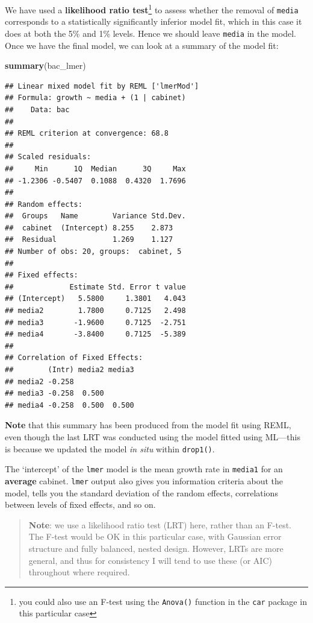 \documentclass[]{book}
\newenvironment{Shaded}{\begin{snugshade}}{\end{snugshade}}
\newcommand{\KeywordTok}[1]{\textcolor[rgb]{0.13,0.29,0.53}{\textbf{#1}}}
\newcommand{\NormalTok}[1]{#1}
\let\rmarkdownfootnote\footnote%
\def\footnote{\protect\rmarkdownfootnote}
\theoremstyle{definition}
\theoremstyle{definition}
\theoremstyle{definition}
\theoremstyle{remark}
\begin{document}
We have used a \textbf{likelihood ratio test}\footnote{you could also
  use an F-test using the \texttt{Anova()} function in the \texttt{car}
  package in this particular case} to assess whether the removal of
\texttt{media} corresponds to a statistically significantly inferior
model fit, which in this case it does at both the 5\% and 1\% levels.
Hence we should leave \texttt{media} in the model. Once we have the
final model, we can look at a summary of the model fit:

\begin{Shaded}
\begin{Highlighting}[]
\KeywordTok{summary}\NormalTok{(bac_lmer)}
\end{Highlighting}
\end{Shaded}

\begin{verbatim}
## Linear mixed model fit by REML ['lmerMod']
## Formula: growth ~ media + (1 | cabinet)
##    Data: bac
## 
## REML criterion at convergence: 68.8
## 
## Scaled residuals: 
##     Min      1Q  Median      3Q     Max 
## -1.2306 -0.5407  0.1088  0.4320  1.7696 
## 
## Random effects:
##  Groups   Name        Variance Std.Dev.
##  cabinet  (Intercept) 8.255    2.873   
##  Residual             1.269    1.127   
## Number of obs: 20, groups:  cabinet, 5
## 
## Fixed effects:
##             Estimate Std. Error t value
## (Intercept)   5.5800     1.3801   4.043
## media2        1.7800     0.7125   2.498
## media3       -1.9600     0.7125  -2.751
## media4       -3.8400     0.7125  -5.389
## 
## Correlation of Fixed Effects:
##        (Intr) media2 media3
## media2 -0.258              
## media3 -0.258  0.500       
## media4 -0.258  0.500  0.500
\end{verbatim}

\textbf{Note} that this summary has been produced from the model fit
using REML, even though the last LRT was conducted using the model
fitted using ML---this is because we updated the model \emph{in situ}
within \texttt{drop1()}.

The `intercept' of the \texttt{lmer} model is the mean growth rate in
\texttt{media1} for an \textbf{average} cabinet. \texttt{lmer} output
also gives you information criteria about the model, tells you the
standard deviation of the random effects, correlations between levels of
fixed effects, and so on.

\newpage

\begin{quote}
\textbf{Note}: we use a likelihood ratio test (LRT) here, rather than an
F-test. The F-test would be OK in this particular case, with Gaussian
error structure and fully balanced, nested design. However, LRTs are
more general, and thus for consistency I will tend to use these (or AIC)
throughout where required.
\end{quote}
\end{document}
